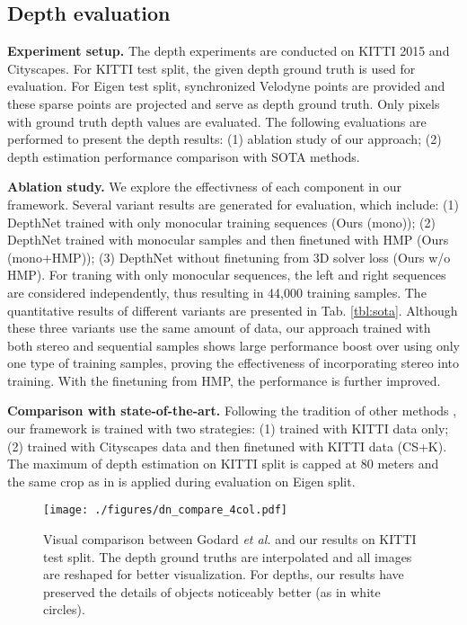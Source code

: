 \documentclass[runningheads]{llncs}
\def\etal{\emph{et al.}}
\begin{document}
\vspace{-0.3\baselineskip}
\subsection{Depth evaluation}
\vspace{-0.3\baselineskip}
\noindent\textbf{Experiment setup.}
The depth experiments are conducted on KITTI 2015 and Cityscapes. For KITTI test split, the given depth ground truth is used for evaluation. For Eigen test split, synchronized Velodyne points are provided and these sparse points are projected and serve as depth ground truth. Only pixels with ground truth depth values are evaluated.
The following evaluations are performed to present the depth results: (1) ablation study of our approach; (2) depth estimation performance comparison with SOTA methods.

\vspace{0.5\baselineskip}
\noindent\textbf{Ablation study.}
We explore the effectivness of each component in our framework. Several variant results are generated for evaluation, which include: (1) DepthNet trained with only monocular training sequences (Ours (mono)); (2) DepthNet trained with monocular samples and then finetuned with HMP (Ours (mono+HMP)); (3) DepthNet without finetuning from 3D solver loss (Ours w/o HMP). For traning with only monocular sequences, the left and right sequences are considered independently, thus resulting in 44,000 training samples. The quantitative results of different variants are presented in Tab. \ref{tbl:sota}. Although these three variants use the same amount of data, our approach trained with both stereo and sequential samples shows large performance boost over using only one type of training samples, proving the effectiveness of incorporating stereo into training. With the finetuning from HMP, the performance is further improved. 

\vspace{0.5\baselineskip}
\noindent\textbf{Comparison with state-of-the-art.}
Following the tradition of other methods \cite{eigen2014depth,zhou2017unsupervised,godard2016unsupervised}, our framework is trained with two strategies: (1) trained with KITTI data only; (2) trained with Cityscapes data and then finetuned with KITTI data (CS+K). The maximum of depth estimation on KITTI split is capped at 80 meters and the same crop as in \cite{eigen2014depth} is applied during evaluation on Eigen split. 

\begin{figure*}
\vspace{-0.5\baselineskip}
\centering
\texttt{[image: ./figures/dn\_compare\_4col.pdf]}
\caption{Visual comparison between Godard \etal \protect\cite{godard2016unsupervised} and our results on KITTI test split. The depth ground truths are interpolated and all images are reshaped for better visualization. For depths, our results have preserved the details of objects noticeably better (as in white circles).}
\label{fig:examples}
\vspace{-0.8\baselineskip}
\end{figure*}
\end{document}
